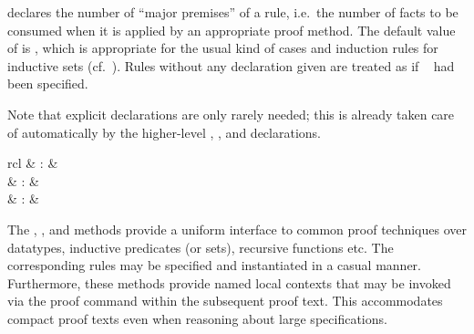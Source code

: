 \begin{isabellebody}
\begin{isamarkuptext}
\begin{descr}
  \item [\hyperlink{attribute.consumes}{\mbox{\isa{consumes}}}~\isa{n}] declares the number of
  ``major premises'' of a rule, i.e.\ the number of facts to be
  consumed when it is applied by an appropriate proof method.  The
  default value of \hyperlink{attribute.consumes}{\mbox{}} is , which is
  appropriate for the usual kind of cases and induction rules for
  inductive sets (cf.\ ).  Rules without any
  \hyperlink{attribute.consumes}{\mbox{}} declaration given are treated as if
  \hyperlink{attribute.consumes}{\mbox{}}~ had been specified.
  
  Note that explicit \hyperlink{attribute.consumes}{\mbox{}} declarations are only
  rarely needed; this is already taken care of automatically by the
  higher-level \hyperlink{attribute.cases}{\mbox{}}, \hyperlink{attribute.induct}{\mbox{}}, and
  \hyperlink{attribute.coinduct}{\mbox{}} declarations.

  \end{descr}%
\end{isamarkuptext}%
\isamarkuptrue%
%
\isamarkuptrue%
%
\begin{isamarkuptext}%
\begin{matharray}{rcl}
    \hypertarget{method.cases}{\hyperlink{method.cases}{\mbox{}}} & : & \isarmeth \\
    \hypertarget{method.induct}{\hyperlink{method.induct}{\mbox{}}} & : & \isarmeth \\
    \hypertarget{method.coinduct}{\hyperlink{method.coinduct}{\mbox{}}} & : & \isarmeth \\
  \end{matharray}

  The \hyperlink{method.cases}{\mbox{}}, \hyperlink{method.induct}{\mbox{}}, and \hyperlink{method.coinduct}{\mbox{}}
  methods provide a uniform interface to common proof techniques over
  datatypes, inductive predicates (or sets), recursive functions etc.
  The corresponding rules may be specified and instantiated in a
  casual manner.  Furthermore, these methods provide named local
  contexts that may be invoked via the \hyperlink{command.case}{\mbox{}} proof command
  within the subsequent proof text.  This accommodates compact proof
  texts even when reasoning about large specifications.


\end{isamarkuptext}
\end{isabellebody}

